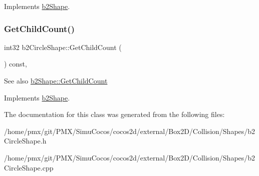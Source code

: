 Implements \hyperlink{classb2Shape_a05a3c445017d96df9238ceefe6ce37ab}{b2\+Shape}.

\mbox{\label{classb2CircleShape_a552db3402aed5d12c3177981e5208065}} 
\subsubsection{\texorpdfstring{Get\+Child\+Count()}{GetChildCount()}\hspace{0.1cm}{\footnotesize\ttfamily [2/2]}}
{\footnotesize\ttfamily int32 b2\+Circle\+Shape\+::\+Get\+Child\+Count (\begin{DoxyParamCaption}{ }\end{DoxyParamCaption}) const\hspace{0.3cm}{\ttfamily [override]}, {\ttfamily [virtual]}}

\begin{DoxySeeAlso}{See also}
\hyperlink{classb2Shape_a05a3c445017d96df9238ceefe6ce37ab}{b2\+Shape\+::\+Get\+Child\+Count} 
\end{DoxySeeAlso}


Implements \hyperlink{classb2Shape_a05a3c445017d96df9238ceefe6ce37ab}{b2\+Shape}.



The documentation for this class was generated from the following files\+:\begin{DoxyCompactItemize}
\item 
/home/pmx/git/\+P\+M\+X/\+Simu\+Cocos/cocos2d/external/\+Box2\+D/\+Collision/\+Shapes/b2\+Circle\+Shape.\+h\item 
/home/pmx/git/\+P\+M\+X/\+Simu\+Cocos/cocos2d/external/\+Box2\+D/\+Collision/\+Shapes/b2\+Circle\+Shape.\+cpp\end{DoxyCompactItemize}
